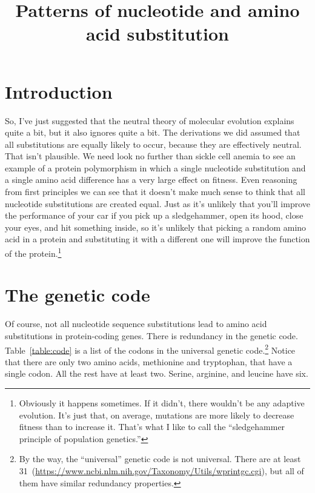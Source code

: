 \documentclass[12pt]{article}
\title{Patterns of nucleotide and amino acid substitution}
\begin{document}
\maketitle

\thispagestyle{first}

\section*{Introduction}

So, I've just suggested that the neutral theory of molecular evolution
explains quite a bit, but it also ignores quite a bit. The derivations
we did assumed that all substitutions are equally likely to occur,
because they are effectively neutral. That isn't plausible. We need
look no further than sickle cell anemia to see an example of a protein
polymorphism in which a single nucleotide substitution and a single
amino acid difference has a very large effect on fitness. Even
reasoning from first principles we can see that it doesn't make much
sense to think that all nucleotide substitutions are created
equal. Just as it's unlikely that you'll improve the performance of
your car if you pick up a sledgehammer, open its hood, close your
eyes, and hit something inside, so it's unlikely that picking a random
amino acid in a protein and substituting it with a different one will
improve the function of the protein.\footnote{Obviously it happens
  sometimes. If it didn't, there wouldn't be any adaptive
  evolution. It's just that, on average, mutations are more likely to
  decrease fitness than to increase it. That's what I like to call the
  ``sledgehammer principle of population
  genetics.''}

\section*{The genetic code}

Of course, not all nucleotide sequence substitutions lead to amino
acid substitutions in protein-coding genes. There is redundancy in the
genetic code. Table~\ref{table:code} is a list of the codons in the
universal genetic code.\footnote{By the way, the ``universal'' genetic
  code is not universal. There are at least
  31~(\url{https://www.ncbi.nlm.nih.gov/Taxonomy/Utils/wprintgc.cgi}),
  but all of them have similar redundancy properties.} Notice that
there are only two amino acids, methionine and tryptophan, that have a
single codon. All the rest have at least two. Serine, arginine, and
leucine have six.
\end{document}

